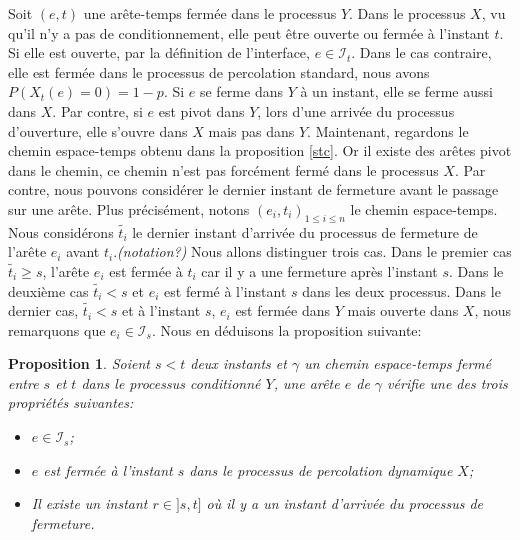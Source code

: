 \documentclass[titlepage,a4paper,12pt]{article}
\newcounter{prop}
\newtheorem{propo}[prop]{Proposition}
\begin{document}
Soit $(e,t)$ une arête-temps fermée dans le processus $Y$. Dans le processus $X$, vu qu'il n'y a pas de conditionnement, elle peut être ouverte ou fermée à l'instant $t$. Si elle est ouverte, par la définition de l'interface, $e\in \mathcal{I}_t$. Dans le cas contraire, elle est fermée dans le processus de percolation standard, nous avons $P(X_t(e) = 0) = 1-p$. Si $e$ se ferme dans $Y$ à un instant, elle se ferme aussi dans $X$. Par contre, si $e$ est pivot dans $Y$, lors d'une arrivée du processus d'ouverture, elle s'ouvre dans $X$ mais pas dans $Y$. Maintenant, regardons le chemin espace-temps obtenu dans la proposition \ref{stc}. Or il existe des arêtes pivot dans le chemin, ce chemin n'est pas forcément fermé dans le processus $X$. Par contre, nous pouvons considérer le dernier instant de fermeture avant le passage sur une arête. Plus précisément, notons $(e_i,t_i)_{1\leqslant i \leqslant n}$ le chemin espace-temps. Nous considérons $\tilde{t_i}$ le dernier instant d'arrivée du processus de fermeture de l'arête $e_i$ avant $t_i$.\emph{\color{blue}(notation?)} Nous allons distinguer trois cas. Dans le premier cas $\tilde{t_i}\geqslant s$, l'arête $e_i$ est fermée à $t_i$ car il y a une fermeture après l'instant $s$. Dans le deuxième cas $\tilde{t_i}< s$ et $e_i$ est fermé à l'instant $s$ dans les deux processus. Dans le dernier cas, $\tilde{t_i}< s$ et à l'instant $s$, $e_i$ est fermée dans $Y$ mais ouverte dans $X$, nous remarquons que $e_i \in \mathcal{I}_s$. Nous en déduisons la proposition suivante:

\begin{propo}\label{couple} Soient $s<t$ deux instants et $\gamma$ un chemin espace-temps fermé entre $s$ et $t$ dans le processus conditionné $Y$, une arête $e$ de $\gamma$ vérifie une des trois propriétés suivantes:
\begin{itemize}[leftmargin = 0.9cm]
\item[(A)] $e\in \mathcal{I}_s$;
\item[(B)] $e$ est fermée à l'instant $s$ dans le processus de percolation dynamique $X$;
\item[(C)] Il existe un instant $r\in ]s,t]$ où il y a un instant d'arrivée du processus de fermeture.
\end{itemize}
\end{propo}
\end{document}
